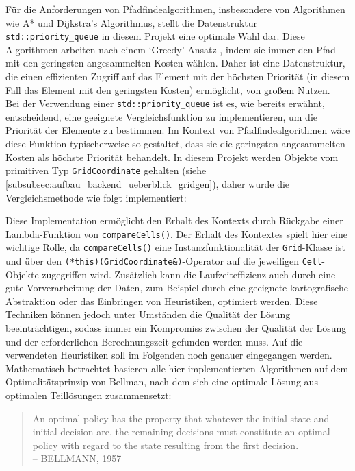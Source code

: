 Für die Anforderungen von Pfadfindealgorithmen, insbesondere von Algorithmen wie A* und Dijkstra's Algorithmus,
stellt die Datenstruktur \texttt{std::priority\_queue} in diesem Projekt eine optimale Wahl dar.
Diese Algorithmen arbeiten nach einem `Greedy'-Ansatz \cite{korte2006}, indem sie immer den Pfad mit den geringsten angesammelten Kosten wählen.
Daher ist eine Datenstruktur, die einen effizienten Zugriff auf das Element mit der höchsten Priorität (in diesem Fall
das Element mit den geringsten Kosten) ermöglicht, von großem Nutzen.\\
Bei der Verwendung einer \texttt{std::priority\_queue} ist es, wie bereits erwähnt, entscheidend, eine geeignete Vergleichsfunktion
zu implementieren, um die Priorität der Elemente zu bestimmen.
Im Kontext von Pfadfindealgorithmen wäre diese Funktion typischerweise so gestaltet, dass sie die geringsten angesammelten
Kosten als höchste Priorität behandelt.
In diesem Projekt werden Objekte vom primitiven Typ \texttt{GridCoordinate} gehalten (siehe \ref{subsubsec:aufbau_backend_ueberblick_gridgen}),
daher wurde die Vergleichsmethode wie folgt implementiert:

Diese Implementation ermöglicht den Erhalt des Kontexts durch Rückgabe einer Lambda-Funktion von \texttt{compareCells()}.
Der Erhalt des Kontextes spielt hier eine wichtige Rolle, da \texttt{compareCells()} eine Instanzfunktionalität der
\texttt{Grid}-Klasse ist und über den \texttt{(*this)(GridCoordinate\&)}-Operator auf die jeweiligen \texttt{Cell}-Objekte
zugegriffen wird.
Zusätzlich kann die Laufzeiteffizienz auch durch eine gute Vorverarbeitung der Daten, zum Beispiel durch eine geeignete
kartografische Abstraktion oder das Einbringen von Heuristiken, optimiert werden.
Diese Techniken können jedoch unter Umständen die Qualität der Lösung beeinträchtigen, sodass immer ein Kompromiss zwischen
der Qualität der Lösung und der erforderlichen Berechnungszeit gefunden werden muss.
Auf die verwendeten Heuristiken soll im Folgenden noch genauer eingegangen werden.\\
Mathematisch betrachtet basieren alle hier implementierten Algorithmen \cite{morin1982} auf dem Optimalitätsprinzip von Bellman, nach
dem sich eine optimale Lösung aus optimalen Teillösungen zusammensetzt:
\begin{quotation}
An optimal policy has the property that whatever the initial state and initial decision are, the remaining decisions
must constitute an optimal policy with regard to the state resulting from the first decision.\\
-- BELLMANN, 1957 \cite{bellman2010}
\end{quotation}
